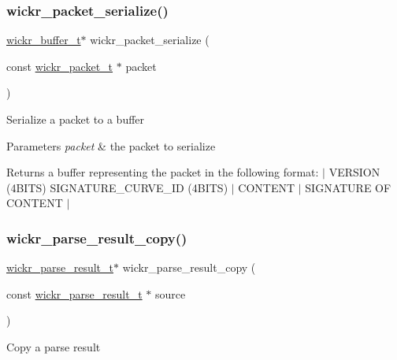\subsubsection{\texorpdfstring{wickr\+\_\+packet\+\_\+serialize()}{wickr\_packet\_serialize()}}
{\footnotesize\ttfamily \mbox{\hyperlink{structwickr__buffer}{wickr\+\_\+buffer\+\_\+t}}$\ast$ wickr\+\_\+packet\+\_\+serialize (\begin{DoxyParamCaption}\item[{const \mbox{\hyperlink{structwickr__packet}{wickr\+\_\+packet\+\_\+t}} $\ast$}]{packet }\end{DoxyParamCaption})}

Serialize a packet to a buffer


\begin{DoxyParams}{Parameters}
{\em packet} & the packet to serialize \\
\hline
\end{DoxyParams}
\begin{DoxyReturn}{Returns}
a buffer representing the packet in the following format\+: $\vert$ V\+E\+R\+S\+I\+ON (4\+B\+I\+TS) S\+I\+G\+N\+A\+T\+U\+R\+E\+\_\+\+C\+U\+R\+V\+E\+\_\+\+ID (4\+B\+I\+TS) $\vert$ C\+O\+N\+T\+E\+NT $\vert$ S\+I\+G\+N\+A\+T\+U\+RE OF C\+O\+N\+T\+E\+NT $\vert$ 
\end{DoxyReturn}
\mbox{\label{group__wickr__protocol_ga1671066ddc19b38ed05d4460d5a96706}} 
\subsubsection{\texorpdfstring{wickr\+\_\+parse\+\_\+result\+\_\+copy()}{wickr\_parse\_result\_copy()}}
{\footnotesize\ttfamily \mbox{\hyperlink{structwickr__parse__result}{wickr\+\_\+parse\+\_\+result\+\_\+t}}$\ast$ wickr\+\_\+parse\+\_\+result\+\_\+copy (\begin{DoxyParamCaption}\item[{const \mbox{\hyperlink{structwickr__parse__result}{wickr\+\_\+parse\+\_\+result\+\_\+t}} $\ast$}]{source }\end{DoxyParamCaption})}

Copy a parse result


